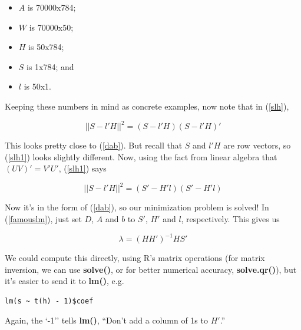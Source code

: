 \begin{itemize}

\item $A$ is 70000x784;

\item $W$ is 70000x50;

\item $H$ is 50x784;

\item $S$ is 1x784; and

\item $l$ is 50x1.

\end{itemize} 

Keeping these numbers in mind as concrete examples,
now note that in (\ref{slh}),

\begin{equation}
\label{slh1}
|| S - l'H ||^2 = (S - l'H)(S - l'H)'
\end{equation}

This looks pretty close to (\ref{dab}).  But recall that $S$ and $l'H$
are row vectors, so (\ref{slh1}) looks slightly different.  Now, using
the fact from linear algebra that $(UV)' = V'U'$, (\ref{slh1}) says

\begin{equation}
\label{slh2}
|| S - l'H ||^2 = (S' - H'l)(S' - H'l)
\end{equation}

Now it's in the form of (\ref{dab}), so our minimization problem is
solved!  In (\ref{famouslm}), just set $D$, $A$ and $b$ to $S'$, $H'$
and $l$, respectively.  This gives us

\begin{equation}
\lambda = (HH')^{-1} HS'
\end{equation}

We could compute this directly, using R's matrix operations (for matrix
inversion, we can use \textbf{solve()}, or for better numerical
accuracy, \textbf{solve.qr()}), but it's easier to send it to
\textbf{lm()}, e.g.

\begin{lstlisting}
lm(s ~ t(h) - 1)$coef
\end{lstlisting}

Again, the `-1'' tells \textbf{lm()}, ``Don't add a column of 1s to $H'$.''
